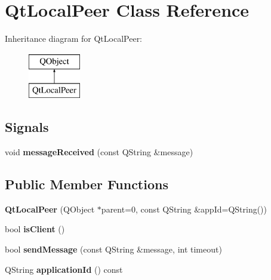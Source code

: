 \hypertarget{class_qt_local_peer}{}\section{Qt\+Local\+Peer Class Reference}
\label{class_qt_local_peer}
Inheritance diagram for Qt\+Local\+Peer\+:\begin{figure}[H]
\begin{center}
\leavevmode
\includegraphics[height=2.000000cm]{class_qt_local_peer}
\end{center}
\end{figure}
\subsection*{Signals}
\begin{DoxyCompactItemize}
\item 
\mbox{\label{class_qt_local_peer_a4436ad976edb6f177de1300b5aab9bfe}} 
void {\bfseries message\+Received} (const Q\+String \&message)
\end{DoxyCompactItemize}
\subsection*{Public Member Functions}
\begin{DoxyCompactItemize}
\item 
\mbox{\label{class_qt_local_peer_a7f6f94203a6ece5b14c8c800da1e40ab}} 
{\bfseries Qt\+Local\+Peer} (Q\+Object $\ast$parent=0, const Q\+String \&app\+Id=Q\+String())
\item 
\mbox{\label{class_qt_local_peer_a72f4ec6cda404661094778f98296d2a9}} 
bool {\bfseries is\+Client} ()
\item 
\mbox{\label{class_qt_local_peer_ab239cb6dcea36512d43df6ca07881ea7}} 
bool {\bfseries send\+Message} (const Q\+String \&message, int timeout)
\item 
\mbox{\label{class_qt_local_peer_aaea3bd443abefa8539cec21f52d23eb6}} 
Q\+String {\bfseries application\+Id} () const
\end{DoxyCompactItemize}
